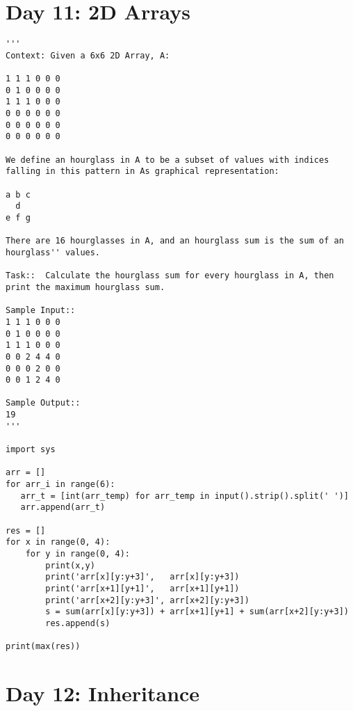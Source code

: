 \documentclass[11pt,a4paper]{article}
\begin{document}
\section{Day 11: 2D Arrays}
\begin{lstlisting}
'''
Context: Given a 6x6 2D Array, A:

1 1 1 0 0 0
0 1 0 0 0 0
1 1 1 0 0 0
0 0 0 0 0 0
0 0 0 0 0 0
0 0 0 0 0 0

We define an hourglass in A to be a subset of values with indices falling in this pattern in As graphical representation:

a b c
  d
e f g

There are 16 hourglasses in A, and an hourglass sum is the sum of an hourglass'' values.

Task::  Calculate the hourglass sum for every hourglass in A, then print the maximum hourglass sum.

Sample Input::
1 1 1 0 0 0
0 1 0 0 0 0
1 1 1 0 0 0
0 0 2 4 4 0
0 0 0 2 0 0
0 0 1 2 4 0

Sample Output::
19
'''

import sys

arr = []
for arr_i in range(6):
   arr_t = [int(arr_temp) for arr_temp in input().strip().split(' ')]
   arr.append(arr_t)

res = []
for x in range(0, 4):
    for y in range(0, 4):
        print(x,y)
        print('arr[x][y:y+3]',   arr[x][y:y+3])
        print('arr[x+1][y+1]',   arr[x+1][y+1])
        print('arr[x+2][y:y+3]', arr[x+2][y:y+3])
        s = sum(arr[x][y:y+3]) + arr[x+1][y+1] + sum(arr[x+2][y:y+3])
        res.append(s)

print(max(res))
\end{lstlisting}































\newpage
\section{Day 12: Inheritance}
\begin{lstlisting}
\end{lstlisting}
\end{document}
